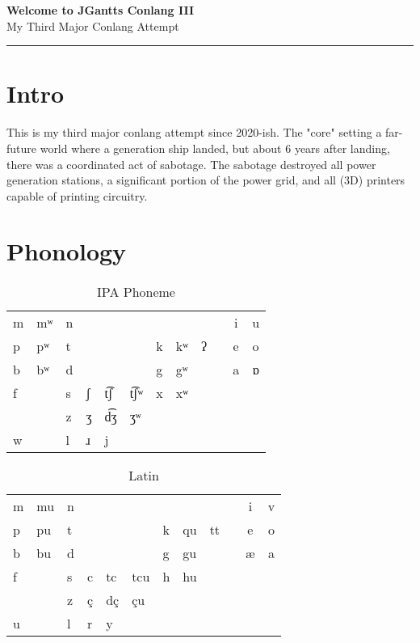 \documentclass[11pt]{article}
\newcommand{\customtitle}[1]{
    \begin{center}
        \vspace*{2cm}
        {\Huge\bfseries\color{primary} #1}\\
        \vspace{0.5cm}
        {\Large My Third Major Conlang Attempt}\\
        \vspace{1cm}
    \end{center}
    \vspace{1cm}
    \hrule
    \vspace{1cm}
}
\begin{document}
\pagecolor{background}

\customtitle{Welcome to JGantts Conlang III}

\section{Intro}
This is my third major conlang attempt since 2020-ish.
The "core" setting a far-future world where a generation ship landed,
but about 6 years after landing, there was a coordinated act of sabotage.
The sabotage destroyed all power generation stations, a significant portion
of the power grid, and all (3D) printers capable of printing circuitry.

\section{Phonology}

\begin{table}[H]
\begin{center}
\caption{IPA Phoneme}
\label{table-phonemes-ipa}
\begin{tabular}{l l l l l l l l l l c c}
 m & mʷ & n & & & &   &    &   & & i & u \\
 p & pʷ & t & & & & k & kʷ & ʔ & & e & o \\
 b & bʷ & d & & & & g & gʷ &   & & a & ɒ \\
 f & & s & ʃ & t͡ʃ & t͡ʃʷ & x & xʷ & & &  \\
 & & z & ʒ & d͡ʒ & ʒʷ & & & & & \\
 w & & l & ɹ & j & & & & \\
\end{tabular}
\end{center}
\end{table}

\begin{table}[H]
\begin{center}
\caption{Latin}
\label{table-phonemes-latin}
\begin{tabular}{l l l l l l l l l l c c}
 m & mu & n & & & &   &    &    & & i & v \\
 p & pu & t & & & & k & qu & tt & & e & o \\
 b & bu & d & & & & g & gu &    & & æ & a \\
 f & & s & c & tc & tcu & h & hu & & & \\
 & & z & ç & dç & çu & & & & & \\
 u & & l & r & y & & & & \\
\end{tabular}
\end{center}
\end{table}
\end{document}
